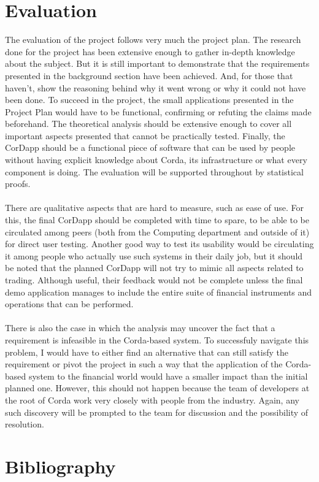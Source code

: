\documentclass[12pt,twoside]{article}
\begin{document}
\section{Evaluation}
The evaluation of the project follows very much the project plan. The research done for the project has been extensive enough to gather in-depth knowledge about the subject. But it is still important to demonstrate that the requirements presented in the background section have been achieved. And, for those that haven't, show the reasoning behind why it went wrong or why it could not have been done. To succeed in the project, the small applications presented in the Project Plan would have to be functional, confirming or refuting the claims made beforehand. The theoretical analysis should be extensive enough to cover all important aspects presented that cannot be practically tested. Finally, the CorDapp should be a functional piece of software that can be used by people without having explicit knowledge about Corda, its infrastructure or what every component is doing. The evaluation will be supported throughout by statistical proofs.
\\ \\
There are qualitative aspects that are hard to measure, such as ease of use. For this, the final CorDapp should be completed with time to spare, to be able to be circulated among peers (both from the Computing department and outside of it) for direct user testing. Another good way to test its usability would be circulating it among people who actually use such systems in their daily job, but it should be noted that the planned CorDapp will not try to mimic all aspects related to trading. Although useful, their feedback would not be complete unless the final demo application manages to include the entire suite of financial instruments and operations that can be performed. 
\\ \\
There is also the case in which the analysis may uncover the fact that a requirement is infeasible in the Corda-based system. To successfuly navigate this problem, I would have to either find an alternative that can still satisfy the requirement or pivot the project in such a way that the application of the Corda-based system to the financial world would have a smaller impact than the initial planned one. However, this should not happen because the team of developers at the root of Corda work very closely with people from the industry. Again, any such discovery will be prompted to the team for discussion and the possibility of resolution.
\newpage
\section{Bibliography}


\end{document}
